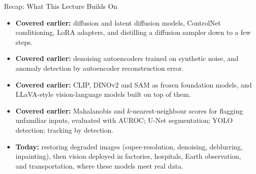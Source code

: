 \begin{frame}{Recap: What This Lecture Builds On}
  \begin{itemize}\itemsep0.4em
    \item \textbf{Covered earlier:} diffusion and latent diffusion models, ControlNet conditioning, LoRA adapters, and distilling a diffusion sampler down to a few steps.
    \item \textbf{Covered earlier:} denoising autoencoders trained on synthetic noise, and anomaly detection by autoencoder reconstruction error.
    \item \textbf{Covered earlier:} CLIP, DINOv2 and SAM as frozen foundation models, and LLaVA-style vision-language models built on top of them.
    \item \textbf{Covered earlier:} Mahalanobis and $k$-nearest-neighbour scores for flagging unfamiliar inputs, evaluated with AUROC; U-Net segmentation; YOLO detection; tracking by detection.
    \item \textbf{Today:} restoring degraded images (super-resolution, denoising, deblurring, inpainting), then vision deployed in factories, hospitals, Earth observation, and transportation, where these models meet real data.
  \end{itemize}
\end{frame}
